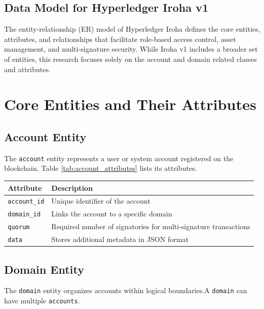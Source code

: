 \documentclass{article}
\begin{document}
\subsection{ Data Model for Hyperledger Iroha v1}

The entity-relationship (ER) model of Hyperledger Iroha defines the core entities, attributes, and relationships that facilitate role-based access control, asset management, and multi-signature security. While Iroha v1 includes a broader set of entities, this research focuses solely on the account and domain related classes and attributes.

\section{Core Entities and Their Attributes}
\subsection{Account Entity}
The \texttt{account} entity represents a user or system account registered on the blockchain. Table \ref{tab:account_attributes} lists its attributes.

\begin{table}[h]
      \centering
      \label{tab:account_entity}
      \renewcommand{\arraystretch}{1.2}
      \begin{tabularx}{\textwidth}{|l|X|}
            \hline
            \textbf{Attribute}   & \textbf{Description}                                            \\ \hline
            \texttt{account\_id} & Unique identifier of the account                                \\ \hline
            \texttt{domain\_id}  & Links the account to a specific domain                          \\ \hline
            \texttt{quorum}      & Required number of signatories for multi-signature transactions \\ \hline
            \texttt{data}        & Stores additional metadata in JSON format                       \\ \hline
      \end{tabularx}
\end{table}

\subsection{Domain Entity}
The \texttt{domain} entity organizes accounts within logical boundaries.A \texttt{domain} can have multiple \texttt{accounts}.
\end{document}
